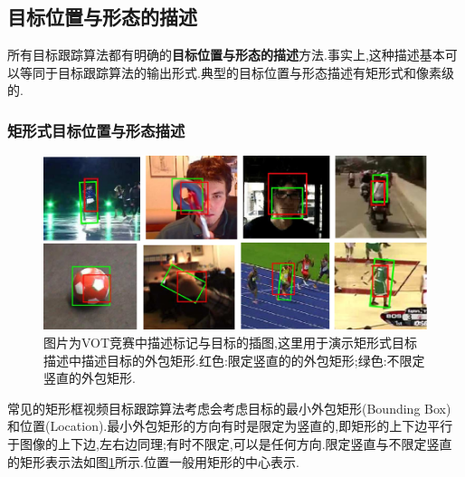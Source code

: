 \subsection{目标位置与形态的描述} 
所有目标跟踪算法都有明确的\textbf{目标位置与形态的描述}方法.事实上,这种描述基本可以等同于目标跟踪算法的输出形式.典型的目标位置与形态描述有矩形式和像素级的.
\par
\subsubsection{矩形式目标位置与形态描述}
\par
\begin{figure}[htbp!]
    \centering
    \includegraphics[width = 1.\textwidth]{chap/img/overlap_examples.pdf}
    \caption{图片为VOT竞赛中描述标记与目标的插图\supercite{VOT_TPAMI},这里用于演示矩形式目标描述中描述目标的外包矩形.红色:限定竖直的的外包矩形;绿色:不限定竖直的外包矩形.}
    \label{fig:bunding_boxes}
\end{figure}
\par
常见的矩形框视频目标跟踪算法考虑会考虑目标的最小外包矩形(Bounding Box)和位置(Location).最小外包矩形的方向有时是限定为竖直的,即矩形的上下边平行于图像的上下边,左右边同理;有时不限定,可以是任何方向.限定竖直与不限定竖直的矩形表示法如图\ref{fig:bunding_boxes}所示.位置一般用矩形的中心表示.
\par

